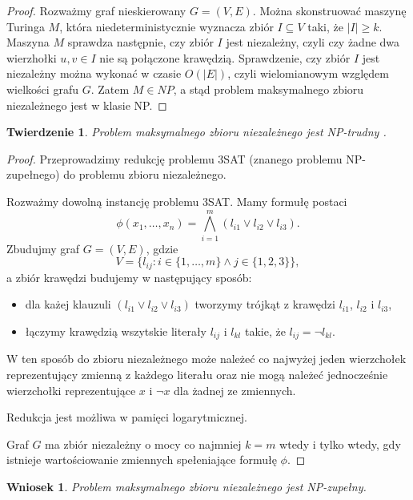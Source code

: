 \documentclass[12pt]{article}
\newtheorem{theorem}{Twierdzenie}
\newtheorem{conclusion}{Wniosek}
\begin{document}
\begin{proof}
    Rozważmy graf nieskierowany $G=(V,E)$. Można skonstruować maszynę Turinga $M$, która niedeterministycznie wyznacza zbiór $I \subseteq V$ taki, że $|I| \geq k$. Maszyna $M$ sprawdza następnie, czy zbiór $I$ jest niezależny, czyli czy żadne dwa wierzhołki $u,v \in I$ nie są połączone krawędzią. Sprawdzenie, czy zbiór $I$ jest niezależny można wykonać w czasie $O(|E|)$, czyli wielomianowym względem wielkości grafu $G$. Zatem $M \in NP$, a stąd problem maksymalnego zbioru niezależnego jest w klasie NP.
\end{proof}

\begin{theorem}
    Problem maksymalnego zbioru niezależnego jest NP-trudny \cite{karp2009reducibility}.
\end{theorem}

\begin{proof}
    Przeprowadzimy redukcję problemu 3SAT (znanego problemu NP-zupełnego) do problemu zbioru niezależnego.

    Rozważmy dowolną instancję problemu 3SAT. Mamy formułę postaci
    $$ \phi(x_1,\dots,x_n) = \bigwedge\limits_{i=1}^{m} (l_{i1} \vee l_{i2} \vee l_{i3}). $$
    Zbudujmy graf $G=(V,E)$, gdzie
    $$ V = \{ l_{ij} : i \in \{1,\dots,m\} \wedge j \in \{1,2,3\} \}, $$
    a zbiór krawędzi budujemy w następujący sposób:
    \begin{itemize}
        \item dla każej klauzuli $(l_{i1} \vee l_{i2} \vee l_{i3})$ tworzymy trójkąt z krawędzi $l_{i1}$, $l_{i2}$ i $l_{i3}$,
        \item łączymy krawędzią wszytskie literały $l_{ij}$ i $l_{kl}$ takie, że $l_{ij} = \neg l_{kl}$.
    \end{itemize}
    W ten sposób do zbioru niezależnego może należeć co najwyżej jeden wierzchołek reprezentujący zmienną z każdego literału oraz nie mogą należeć jednocześnie wierzchołki reprezentujące $x$ i $\neg x$ dla żadnej ze zmiennych.

    Redukcja jest możliwa w pamięci logarytmicznej.

    Graf $G$ ma zbiór niezależny o mocy co najmniej $k=m$ wtedy i tylko wtedy, gdy istnieje wartościowanie zmiennych spełeniające formułę $\phi$.
\end{proof}

\begin{conclusion}
    Problem maksymalnego zbioru niezależnego jest NP-zupełny.
\end{conclusion}
\end{document}
